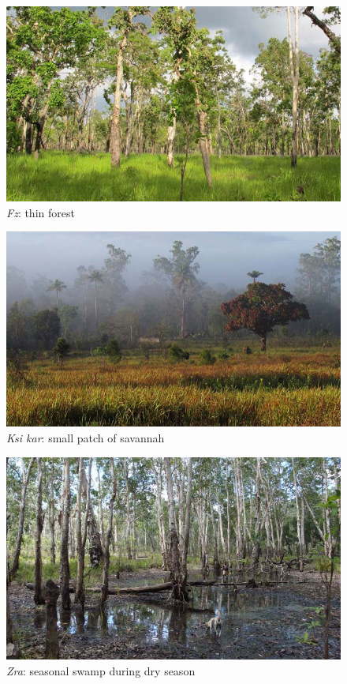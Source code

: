 \begin{figure}
    \includegraphics[width=.9\textwidth]{figures/landscape4.jpg}
  \caption[\emph{Fz}: thin forest]{\emph{Fz}: thin forest}
  \label{fig:landscape4}
\end{figure}%

\begin{figure}
    \includegraphics[width=.9\textwidth]{figures/landscape5.jpg}
  \caption[\emph{Ksi kar}: small patch of savannah]{\emph{Ksi kar}: small patch of savannah}
  \label{fig:landscape5}
\end{figure}%

\begin{figure}
    \includegraphics[width=.9\textwidth]{figures/landscape6.jpg}
  \caption[\emph{Zra}: seasonal swamp during dry season]{\emph{Zra}: seasonal swamp during dry season}
  \label{fig:landscape6}
\end{figure}%


